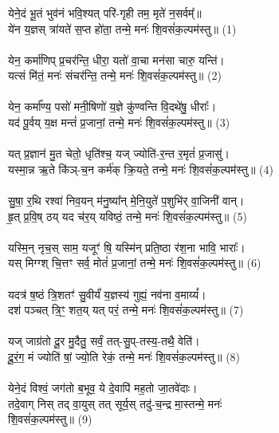 \subsubsection{}
{\small
येने॒दं भू॒तं भुव॑नं भवि॒श्यत् परि॑-गृही तम॒ मृते॑ न॒सर्वम्᳚॥ \\
ये॑न य॒ज्ञस् त्रा॑यते॑ स॒प्त हो॑ता॒ तन्मे॒ मनः॑ शि॒वसं॑क॒ल्पम॑स्तु॥ (1)\\
\\
येन॒ कर्मा॑णिप् प्र॒चर॑न्ति॒ धीरा॒ यतो॑ वा॒चा मन॑सा चारु॒ यन्ति॑। \\
यत्सं मि॑तं॒ मनः॑ संचर॑न्ति॒ तन्मे॒ मनः॑ शि॒वसं॑क॒ल्पम॑स्तु॥ (2)\\
\\
येन॒ कर्मा᳚ण्य॒ पसो॑ मनी॒षिणो॑ य॒ज्ञे कु॑ण्वन्ति वि॒दथे॑षु॒ धीराः᳚। \\
यद॑ पू॒र्वय् य॒क्ष मन्तं॑ प्र॒जानां॒ तन्मे॒ मनः॑ शि॒वसं॑क॒ल्पम॑स्तु॥ (3)\\
\\
यत् प्र॒ज्ञान॑ मु॒त चेतो॒ धृति॑श्च॒ यज् ज्योति॑-र॒न्त र॒मृतं॑ प्र॒जासु॑।\\
यस्मा॒न्न ऋ॒ते कि॑ञ्-च॒न कर्म॑क् क्रि॒यते॒ तन्मे॒ मनः॑ शि॒वसं॑क॒ल्पम॑स्तु॥ (4)\\
\\
सु॒षा॒ र॒थि रश्वा॑ निव॒यन् म॑नु॒ष्या᳚न् मे॒नि॒युते॑ प॒शुभि॑र् वा॒जिनी॑ वान्। \\
हृ॒त् प्र॒वि॒ष् ठय् यद च॑र॒य् यविष्ठं॒ तन्मे॒ मनः॑ शि॒वसं॑क॒ल्पम॑स्तु॥ (5)\\
\\
यस्मि॒न् नृच॒स् साम॒ यजूꣳ॑ षि॒ यस्मि॑न् प्रति॒ष्ठा र॑श॒ना भावि॒ भाराः᳚। \\
यस् मिग्ग्श् चि॒त्तꣳ सर्व॒ मोतं॑ प्र॒जानां॒ तन्मे॒ मनः॑ शि॒वसं॑क॒ल्पम॑स्तु॥ (6)\\
\\
यदत्र॑ ष॒ष्ठं त्रि॒शतꣳ॑ सु॒वीर्यं॑ य॒ज्ञस्य॑ गुह्यं॒ नव॑ना व॒माय्यं᳚। \\
दश॑ पञ्चत् त्रि॒ꣳ॒ शत॒य् यत् परं॒ तन्मे॒ मनः॑ शि॒वसं॑क॒ल्पम॑स्तु॥ (7)\\
\\
यज् जाग्र॑तो दू॒र मु॒दैतु॒ सर्वं॒ तत्-सु॒प्-तस्य॒-तथै॒ वेति॑।\\
दू॒रं॒ग॒ मं ज्योति॑ षां॒ ज्यो॒ति रेकं॒ तन्मे॒ मनः॑ शि॒वसं॑क॒ल्पम॑स्तु॥ (8)\\
\\
येने॒दं विश्वं॒ जग॑तो ब॒भूव॒ ये दे॒वापि॑ मह॒तो जा॒तवे॑दाः।\\
तदे॒वाग् निस् तद् वा॒युस् तत् सूर्य॒स् तदु॑-च॒न्द्र मा॒स्तन्मे॒ मनः॑\\
 शि॒वसं॑क॒ल्पम॑स्तु॥ (9)\\
}
